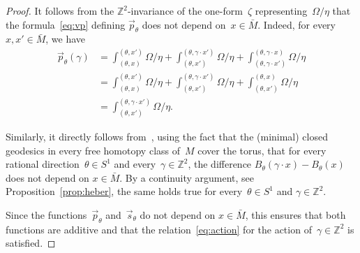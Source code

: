 \documentclass[AHL,Unicode,longabstracts,published]{cedram}
\newcommand{\Z}{\mathbb{Z}}
\begin{document}
\begin{proof}
It follows from the $\Z^2$-invariance of the one-form~$\zeta$ representing~$\Omega/\eta$ that the formula~\eqref{eq:vp} defining $\vec{p}_{\theta}$ does not depend on~$x \in \bar{M}$. Indeed, for every $x,x'\in \bar{M}$, we have
\begin{align*}
\vec{p}_\theta(\gamma)&=\int_{(\theta,x)}^{(\theta,x')}\Omega/\eta +\int_{(\theta,x')}^{(\theta,\gamma\cdot x')}\Omega/\eta+\int_{(\theta,\gamma\cdot x')}^{(\theta,\gamma\cdot x)}\Omega/\eta\\
&=\int_{(\theta,x)}^{(\theta,x')}\Omega/\eta +\int_{(\theta,x')}^{(\theta,\gamma\cdot x')}\Omega/\eta+\int_{(\theta, x')}^{(\theta, x)}\Omega/\eta\\
&=\int_{(\theta,x')}^{(\theta,\gamma\cdot x')}\Omega/\eta.
\end{align*}

Similarly, it directly follows from~\cite[Corollary~2.6]{CS86}, using the fact that the (minimal) closed geodesics in every free homotopy class of~$M$ cover the torus, that for every rational direction~\mbox{$\theta \in S^1$} and every~$\gamma \in \Z^2$, the difference $B_{\theta}(\gamma\cdot x)-B_{\theta}(x)$ does not depend on $x \in \bar{M}$. By a continuity argument, see Proposition~\ref{prop:heber}, the same holds true for every~$\theta\in S^{1}$ and $\gamma\in\Z^{2}$.

Since the functions~$\vec{p}_\theta$ and~$\vec{s}_\theta$ do not depend on $x\in\bar{M}$, this ensures that both functions are additive and that the relation~\eqref{eq:action} for the action of~$\gamma \in \Z^2$ is satisfied.
\end{proof}

\end{document}
